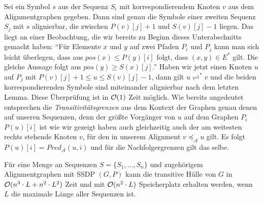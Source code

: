 Sei ein Symbol $s$ aus der Sequenz $S_i$ mit korrespondierendem Knoten $v$ aus dem Alignmentgraphen gegeben. Dann sind genau die Symbole einer zweiten Sequenz $S_j$ mit $s$ alignierbar, die zwischen $P(v)[j] + 1$ und $S(v)[j] - 1$ liegen. Das liegt an einer Beobachtung, die wir bereits zu Beginn dieses Unterabschnitts gemacht haben: \enquote{Für Elemente $x$ und $y$ auf zwei Pfaden $P_i$ und $P_j$ kann man sich leicht überlegen, dass aus $pos(x) \leq P(y)[i]$ folgt, dass $(x,y)\in E^*$ gilt. Die gleiche Aussage folgt aus $pos(y) \geq S(x)[j]$.} Haben wir jetzt einen Knoten $u$ auf $P_j$ mit $P(v)[j] +1 \leq u \leq S(v)[j] - 1$, dann gilt $u \rightleftharpoons^{*} v$ und die beiden korrespondierenden Symbole sind miteinander alignierbar nach dem letzten Lemma. Diese Überprüfung ist in $\mathcal{O}(1)$ Zeit möglich. Wie bereits angedeutet entsprechen die \emph{Transitivitätsgrenzen} aus dem Kontext der Graphen genau denen auf unseren Sequenzen, denn der größte Vorgänger von $u$ auf dem Graphen $P_i$ $P(u)[i]$ ist wie wir gezeigt haben auch gleichzeitig auch der am weitesten rechts stehende Knoten $v$, für den in unserem Alignment $v \preceq_{\mathcal{A}} u$ gilt. Es folgt $P(u)[i] = Pred_{\mathcal{A}}(u,i)$ und für die Nachfolgergrenzen gilt das selbe.

\begin{korollar}
	Für eine Menge an Sequenzen $S = \{S_1, \dots, S_n\}$ und zugehörigem Alignmentgraphen mit SSDP $(G,P)$ kann die transitive Hülle von $G$ in $\mathcal{O}(n^3\cdot L + n^2\cdot L^2)$ Zeit und mit $\mathcal{O}(n^2\cdot L)$ Speicherplatz erhalten werden, wenn $L$ die maximale Länge aller Sequenzen ist.
\end{korollar}

